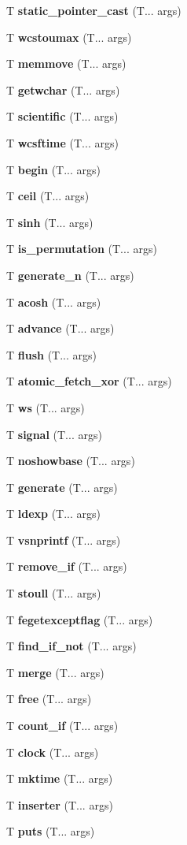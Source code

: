 \begin{DoxyCompactItemize}
T \textbf{ static\+\_\+pointer\+\_\+cast} (T... args)
\item 
T \textbf{ wcstoumax} (T... args)
\item 
T \textbf{ memmove} (T... args)
\item 
T \textbf{ getwchar} (T... args)
\item 
T \textbf{ scientific} (T... args)
\item 
T \textbf{ wcsftime} (T... args)
\item 
T \textbf{ begin} (T... args)
\item 
T \textbf{ ceil} (T... args)
\item 
T \textbf{ sinh} (T... args)
\item 
T \textbf{ is\+\_\+permutation} (T... args)
\item 
T \textbf{ generate\+\_\+n} (T... args)
\item 
T \textbf{ acosh} (T... args)
\item 
T \textbf{ advance} (T... args)
\item 
T \textbf{ flush} (T... args)
\item 
T \textbf{ atomic\+\_\+fetch\+\_\+xor} (T... args)
\item 
T \textbf{ ws} (T... args)
\item 
T \textbf{ signal} (T... args)
\item 
T \textbf{ noshowbase} (T... args)
\item 
T \textbf{ generate} (T... args)
\item 
T \textbf{ ldexp} (T... args)
\item 
T \textbf{ vsnprintf} (T... args)
\item 
T \textbf{ remove\+\_\+if} (T... args)
\item 
T \textbf{ stoull} (T... args)
\item 
T \textbf{ fegetexceptflag} (T... args)
\item 
T \textbf{ find\+\_\+if\+\_\+not} (T... args)
\item 
T \textbf{ merge} (T... args)
\item 
T \textbf{ free} (T... args)
\item 
T \textbf{ count\+\_\+if} (T... args)
\item 
T \textbf{ clock} (T... args)
\item 
T \textbf{ mktime} (T... args)
\item 
T \textbf{ inserter} (T... args)
\item 
T \textbf{ puts} (T... args)
\item 

\end{DoxyCompactItemize}
